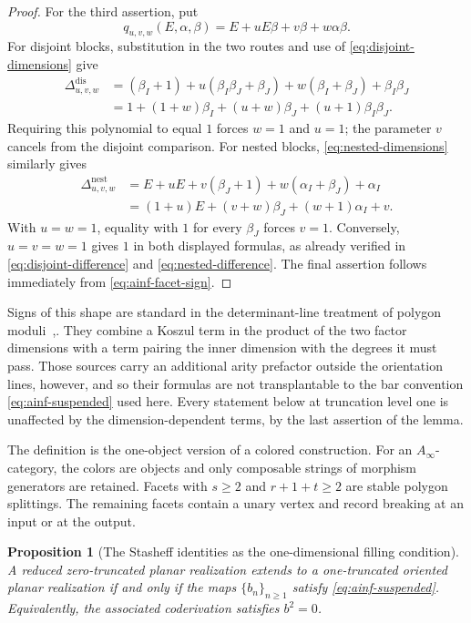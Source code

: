 \documentclass[11pt,letterpaper,twoside]{article}
\theoremstyle{plain}
\newtheorem{proposition}[theorem]{Proposition}
\theoremstyle{definition}
\theoremstyle{remark}
\let\cite\citep
\newcommand{\Ainf}{A_\infty}
\begin{document}
\begin{proof}
For the third assertion, put
\[
 q_{u,v,w}(E,\alpha,\beta)
 =E+uE\beta+v\beta+w\alpha\beta.
\]
For disjoint blocks, substitution in the two routes and use of \eqref{eq:disjoint-dimensions} give
\begin{align*}
 \Delta_{u,v,w}^{\mathrm{dis}}
 &=(\beta_I+1)+u(\beta_I\beta_J+\beta_J)
   +w(\beta_I+\beta_J)+\beta_I\beta_J\\
 &=1+(1+w)\beta_I+(u+w)\beta_J+(u+1)\beta_I\beta_J.
\end{align*}
Requiring this polynomial to equal \(1\) forces \(w=1\) and \(u=1\); the parameter \(v\) cancels from the disjoint comparison.  For nested blocks, \eqref{eq:nested-dimensions} similarly gives
\begin{align*}
 \Delta_{u,v,w}^{\mathrm{nest}}
 &=E+uE+v(\beta_J+1)+w(\alpha_I+\beta_J)+\alpha_I\\
 &=(1+u)E+(v+w)\beta_J+(w+1)\alpha_I+v.
\end{align*}
With \(u=w=1\), equality with \(1\) for every \(\beta_J\) forces \(v=1\).  Conversely, \(u=v=w=1\) gives \(1\) in both displayed formulas, as already verified in \eqref{eq:disjoint-difference} and \eqref{eq:nested-difference}.  The final assertion follows immediately from \eqref{eq:ainf-facet-sign}.
\end{proof}

Signs of this shape are standard in the determinant-line treatment of polygon moduli~\cite[\S9c]{abouzaidseidel2010},\cite[\S12b]{seidel2008}.  They combine a Koszul term in the product of the two factor dimensions with a term pairing the inner dimension with the degrees it must pass.  Those sources carry an additional arity prefactor outside the orientation lines, however, and so their formulas are not transplantable to the bar convention \eqref{eq:ainf-suspended} used here.  Every statement below at truncation level one is unaffected by the dimension-dependent terms, by the last assertion of the lemma.

The definition is the one-object version of a colored construction.  For an \(\Ainf\)-category, the colors are objects and only composable strings of morphism generators are retained.  Facets with \(s\geq2\) and \(r+1+t\geq2\) are stable polygon splittings.  The remaining facets contain a unary vertex and record breaking at an input or at the output.

\begin{proposition}[The Stasheff identities as the one-dimensional filling condition]\label{prop:ainf-one-truncation}
A reduced zero-truncated planar realization extends to a one-truncated oriented planar realization if and only if the maps \(\{b_n\}_{n\geq1}\) satisfy \eqref{eq:ainf-suspended}.  Equivalently, the associated coderivation satisfies \(b^2=0\).
\end{proposition}
\end{document}
